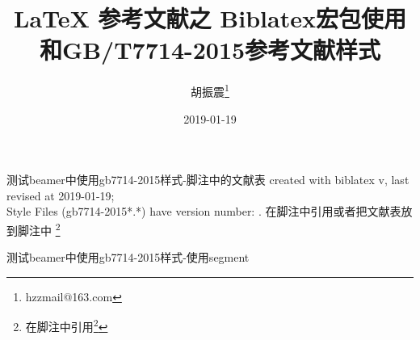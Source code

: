 \documentclass[xcolor=svgnames]{beamer}
\title{\LaTeX{} 参考文献之 \newline
Biblatex宏包使用和GB/T7714-2015参考文献样式}
\author{胡振震\footnote{hzzmail@163.com}}
\date{2019-01-19}
\begin{document}

\begin{frame}{测试beamer中使用gb7714-2015样式-脚注中的文献表}
    created with biblatex v\versionofbiblatex, last revised at 2019-01-19;\\ \hspace*{1.5em} Style Files (gb7714-2015*.*) have version number: \versionofgbtstyle.
\tiny
在脚注中引用或者把文献表放到脚注中
\footnote{在脚注中引用\footcite{张伯伟2002--}}
\end{frame}

\begin{frame}{测试beamer中使用gb7714-2015样式-使用segment}

\printbibliography[segment=0,heading=bibliography,title=参考文献]

\end{frame}
\end{document}
